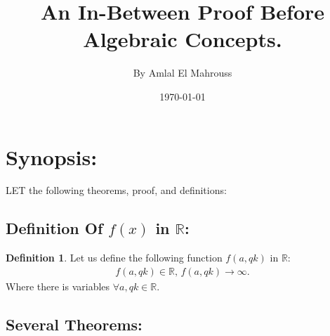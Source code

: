 \documentclass[10pt]{article}
\title{%
	\vspace{-1.5em}%
	\large\textbf{An In-Between Proof Before Algebraic Concepts.}%
}
\author{By Amlal El Mahrouss}
\date{\today}
\theoremstyle{plain}
\theoremstyle{definition}
\newtheorem{definition}[theorem]{Definition}
\theoremstyle{remark}
\begin{document}

\maketitle
\tableofcontents
\newpage

\section{Synopsis:}

\lettrine[lines=1, lhang=0.1, loversize=0.2]{L}ET the following theorems, proof, and definitions:

\subsection{Definition Of $f(x)$ in $\mathbb{R}$:}

\begin{definition}
	Let us define the following function $f(a, qk)$ in $\mathbb{R}$:
	\begin{align*}
		f(a, qk) \in \mathbb{R}, \, f(a, qk) \to \infty.
	\end{align*}
	Where there is variables $\forall a, qk \in \mathbb{R}$.
\end{definition}

\subsection{Several Theorems:}
\end{document}
